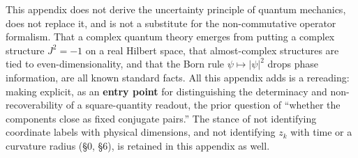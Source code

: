 \documentclass[11pt,a4paper]{article}
\begin{document}
This appendix does not derive the uncertainty principle of quantum
mechanics, does not replace it, and is not a substitute for the
non-commutative operator formalism. That a complex quantum theory
emerges from putting a complex structure \(J^2=-1\) on a real Hilbert
space, that almost-complex structures are tied to even-dimensionality,
and that the Born rule \(\psi\mapsto|\psi|^2\) drops phase information,
are all known standard facts. All this appendix adds is a rereading:
making explicit, as an \textbf{entry point} for distinguishing the
determinacy and non-recoverability of a square-quantity readout, the
prior question of ``whether the components close as fixed conjugate
pairs.'' The stance of not identifying coordinate labels with physical
dimensions, and not identifying \(z_k\) with time or a curvature radius
(§0, §6), is retained in this appendix as well.
\end{document}
